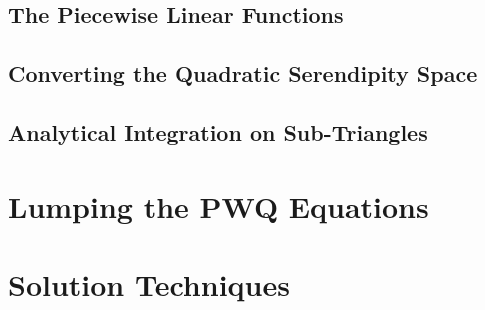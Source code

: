 \documentclass[preprint,review,10pt]{elsarticle}
\begin{document}
\subsection{The Piecewise Linear Functions} \label{sec::PWQ_PWL}

\subsection{Converting the Quadratic Serendipity Space} \label{sec::PWQ_Ser}

\subsection{Analytical Integration on Sub-Triangles} \label{sec::PWQ_Int}

\section{Lumping the PWQ Equations} \label{sec::Lumping}


\section{Solution Techniques} \label{sec::Solve}

\end{document}
